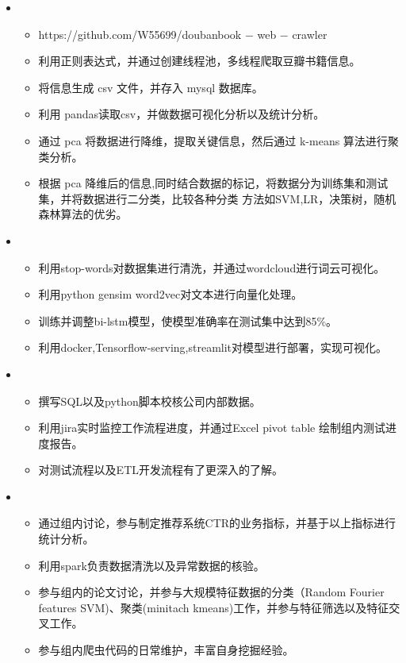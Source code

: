 \begin{itemize}[leftmargin=*]
    \newpage
    \item
      {\small
      \begin{itemize}
       \item https://github.com/W55699/doubanbook − web − crawler
       \item 利用正则表达式，并通过创建线程池，多线程爬取豆瓣书籍信息。
       \item 将信息生成 csv 文件，并存入 mysql 数据库。
       \item 利用 pandas读取csv，并做数据可视化分析以及统计分析。
       \item 通过 pca 将数据进行降维，提取关键信息，然后通过 k-means 算法进行聚类分析。 
       \item 根据 pca 降维后的信息,同时结合数据的标记，将数据分为训练集和测试集，并将数据进行二分类，比较各种分类
             方法如SVM,LR，决策树，随机森林算法的优劣。
      \end{itemize}
      }
    \item
      {\small
      \begin{itemize}
      
       \item 利用stop-words对数据集进行清洗，并通过wordcloud进行词云可视化。
       \item 利用python gensim word2vec对文本进行向量化处理。
       \item 训练并调整bi-lstm模型，使模型准确率在测试集中达到85\%。
       \item 利用docker,Tensorflow-serving,streamlit对模型进行部署，实现可视化。
      \end{itemize}
      }
   
     \item
        {\small
      \begin{itemize}
      \item 撰写SQL以及python脚本校核公司内部数据。
        \item 利用jira实时监控工作流程进度，并通过Excel pivot table 绘制组内测试进度报告。
         \item 对测试流程以及ETL开发流程有了更深入的了解。
         
       \end{itemize}
       }
        \item
           {\small
      \begin{itemize}
      \item 通过组内讨论，参与制定推荐系统CTR的业务指标，并基于以上指标进行统计分析。
         \item 利用spark负责数据清洗以及异常数据的核验。
          \item 参与组内的论文讨论，并参与大规模特征数据的分类（Random Fourier features SVM)、聚类(minitach kmeans)工作，并参与特征筛选以及特征交叉工作。
           \item 参与组内爬虫代码的日常维护，丰富自身挖掘经验。


\end{itemize}}
\end{itemize}
